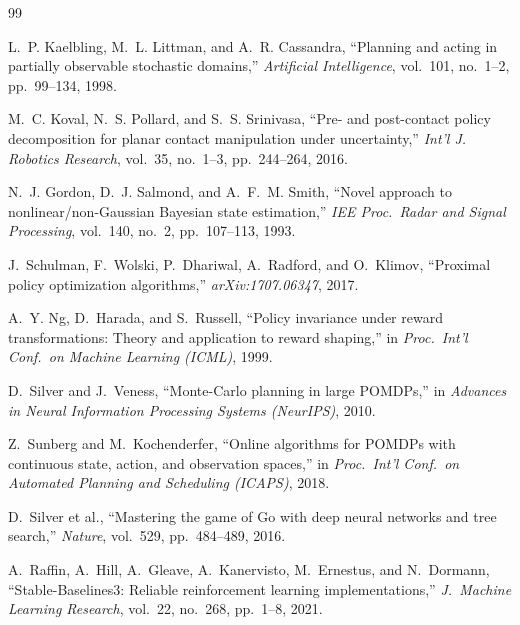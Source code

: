 \documentclass[conference]{IEEEtran}
\begin{document}
\begin{thebibliography}{99}

L.~P. Kaelbling, M.~L. Littman, and A.~R. Cassandra,
``Planning and acting in partially observable stochastic domains,''
\emph{Artificial Intelligence}, vol.~101, no.~1--2, pp.~99--134, 1998.

M.~C. Koval, N.~S. Pollard, and S.~S. Srinivasa,
``Pre- and post-contact policy decomposition for planar contact manipulation
under uncertainty,''
\emph{Int'l J. Robotics Research}, vol.~35, no.~1--3, pp.~244--264, 2016.

N.~J. Gordon, D.~J. Salmond, and A.~F.~M. Smith,
``Novel approach to nonlinear/non-Gaussian Bayesian state estimation,''
\emph{IEE Proc.\ Radar and Signal Processing}, vol.~140, no.~2,
pp.~107--113, 1993.

J.~Schulman, F.~Wolski, P.~Dhariwal, A.~Radford, and O.~Klimov,
``Proximal policy optimization algorithms,''
\emph{arXiv:1707.06347}, 2017.

A.~Y. Ng, D.~Harada, and S.~Russell,
``Policy invariance under reward transformations: Theory and application
to reward shaping,''
in \emph{Proc.\ Int'l Conf.\ on Machine Learning (ICML)}, 1999.

D.~Silver and J.~Veness,
``Monte-Carlo planning in large POMDPs,''
in \emph{Advances in Neural Information Processing Systems (NeurIPS)}, 2010.

Z.~Sunberg and M.~Kochenderfer,
``Online algorithms for POMDPs with continuous state, action, and
observation spaces,''
in \emph{Proc.\ Int'l Conf.\ on Automated Planning and Scheduling (ICAPS)},
2018.

D.~Silver et al.,
``Mastering the game of Go with deep neural networks and tree search,''
\emph{Nature}, vol.~529, pp.~484--489, 2016.

A.~Raffin, A.~Hill, A.~Gleave, A.~Kanervisto, M.~Ernestus, and N.~Dormann,
``Stable-Baselines3: Reliable reinforcement learning implementations,''
\emph{J.\ Machine Learning Research}, vol.~22, no.~268, pp.~1--8, 2021.

\end{thebibliography}
\end{document}
